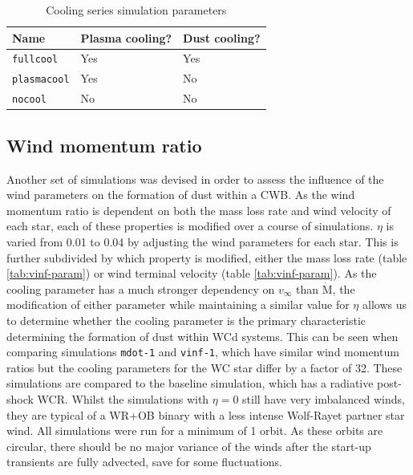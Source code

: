 \documentclass[fleqn,usenatbib]{mnras}
\begin{document}

\begin{table}
  \centering
  \begin{tabular}{lll}
    \hline
    Name & Plasma cooling? & Dust cooling? \\
    \hline
    \texttt{fullcool} & Yes & Yes \\ 
    \texttt{plasmacool} & Yes & No \\
    \texttt{nocool} & No & No \\
    \hline
  \end{tabular}
  \caption{Cooling series simulation parameters}
  \label{tab:cooling-param}
\end{table}

\subsection{Wind momentum ratio}

Another set of simulations was devised in order to assess the influence of the wind parameters on the formation of dust within a CWB.
As the wind momentum ratio is dependent on both the mass loss rate and wind velocity of each star, each of these properties is modified over a course of simulations.
$\eta$ is varied from 0.01 to 0.04 by adjusting the wind parameters for each star.
This is further subdivided by which property is modified, either the mass loss rate (table \ref{tab:vinf-param}) or wind terminal velocity (table \ref{tab:vinf-param}).
As the cooling parameter has a much stronger dependency on $v_\infty$ than $\dot{\text{M}}$, the modification of either parameter while maintaining a similar value for $\eta$ allows us to determine whether the cooling parameter is the primary characteristic determining the formation of dust within WCd systems.
This can be seen when comparing simulations \texttt{mdot-1} and \texttt{vinf-1}, which have similar wind momentum ratios but the cooling parameters for the WC star differ by a factor of 32.
These simulations are compared to the baseline simulation, which has a radiative post-shock WCR.
Whilst the simulations with $\eta = 0$ still have very imbalanced winds, they are typical of a WR+OB binary with a less intense Wolf-Rayet partner star wind.
All simulations were run for a minimum of 1 orbit.
As these orbits are circular, there should be no major variance of the winds after the start-up transients are fully advected, save for some fluctuations.
\end{document}
